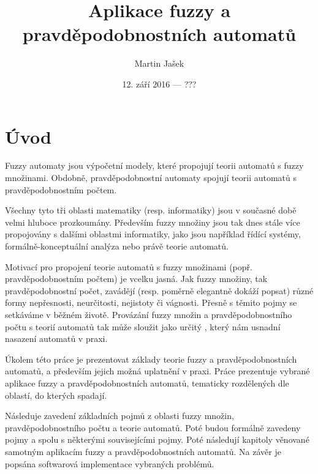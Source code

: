 \documentclass[a4paper,10pt]{article}
\title{Aplikace fuzzy a pravděpodobnostních automatů}
\author{Martin Jašek}
\date{12. září 2016 --- ???}
\begin{document}
\maketitle
\tableofcontents
\newpage

\section{Úvod}
Fuzzy automaty jsou výpočetní modely, které propojují teorii automatů s fuzzy množinami. Obdobně, pravděpodobnostní automaty spojují teorii automatů s pravděpodobnostním počtem.

Všechny tyto tři oblasti matematiky (resp. informatiky) jsou v současné době velmi hluboce prozkoumány. Především fuzzy množiny jsou tak dnes stále více propojovány s dalšími oblastmi informatiky, jako jsou například řídící systémy\cite{Jan-FouFuzzContPracAppr}, formálně-konceptuální analýza\cite{Bel-FuzRelSys} nebo právě teorie automatů.

Motivací pro propojení teorie automatů s fuzzy množinami (popř. pravděpodobnostním počtem) je vcelku jasná. Jak fuzzy množiny, tak pravděpodobnostní počet, zavádějí (resp. poměrně elegantně dokáží popsat) různé formy nepřesnosti, neurčitosti, nejistoty či vágnosti. Přesně s těmito pojmy se setkáváme v běžném životě. Provázání fuzzy množin a pravděpodobnostního počtu s teorií automatů tak může sloužit jako určitý , který nám usnadní nasazení automatů v praxi.

Úkolem této práce je prezentovat základy teorie fuzzy a pravděpodobnostních automatů, a především jejich možná uplatnění v praxi. Práce prezentuje vybrané aplikace fuzzy a pravděpodobnostních automatů, tematicky rozdělených dle oblastí, do kterých spadají.

Následuje zavedení základních pojmů z oblasti fuzzy množin, pravděpodobnostního počtu a teorie automatů. Poté budou formálně zavedeny pojmy  a  spolu s některými souvisejícími pojmy. Poté následují kapitoly věnované samotným aplikacím fuzzy a pravděpodobnostních automatů. Na závěr je popsána softwarová implementace vybraných problémů.


\end{document}

